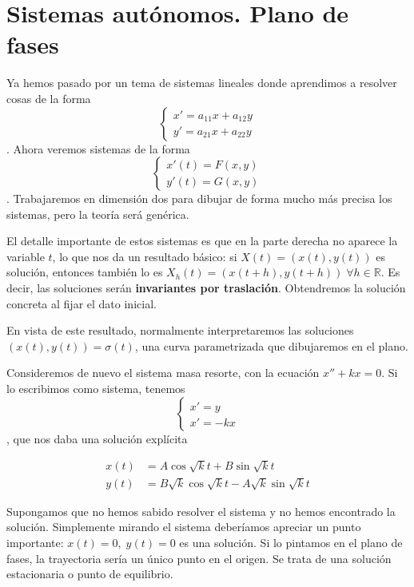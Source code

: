 \newcommand{\sist}[2]{\[ \left\{\begin{array}{rcl} x' &=& #1 \\ y' &=& #2 \end{array}\right. \]}

\section{Sistemas autónomos. Plano de fases}

Ya hemos pasado por un tema de sistemas lineales donde aprendimos a resolver cosas de la forma \[ \begin{cases}x'= a_{11}x + a_{12}y \\ y'=a_{21}x + a_{22}y \end{cases} \]. Ahora veremos sistemas de la forma \[ \begin{cases} x'(t) = F(x,y) \\ y'(t) = G(x,y) \end{cases} \]. Trabajaremos en dimensión dos para dibujar de forma mucho más precisa los sistemas, pero la teoría será genérica.

El detalle importante de estos sistemas es que en la parte derecha no aparece la variable $t$, lo que nos da un resultado básico: si $X(t) = (x(t), y(t))$ es solución, entonces también lo es $X_h(t) = (x(t+h), y(t+h))\; ∀h∈ℝ$. Es decir, las soluciones serán \textbf{invariantes por traslación}. Obtendremos la solución concreta al fijar el dato inicial.

En vista de este resultado, normalmente interpretaremos las soluciones $(x(t), y(t)) = σ(t)$, una curva parametrizada que dibujaremos en el plano.

Consideremos de nuevo el sistema masa resorte, con la ecuación $x'' +kx = 0$. Si lo escribimos como sistema, tenemos \[ \begin{cases} x' = y \\ x' = -kx \end{cases} \], que nos daba una solución explícita

\begin{align*}
x(t) &= A\cos \sqrt{k}t + B \sin \sqrt{k} t \\
y(t) &= B\sqrt{k}\cos \sqrt{k} t - A \sqrt{k}\sin \sqrt{k} t
\end{align*}

Supongamos que no hemos sabido resolver el sistema y no hemos encontrado la solución. Simplemente mirando el sistema deberíamos apreciar un punto importante: $x(t) = 0,\;y(t) = 0$ es una solución. Si lo pintamos en el plano de fases, la trayectoria sería un único punto en el origen. Se trata de una solución estacionaria o punto de equilibrio.

